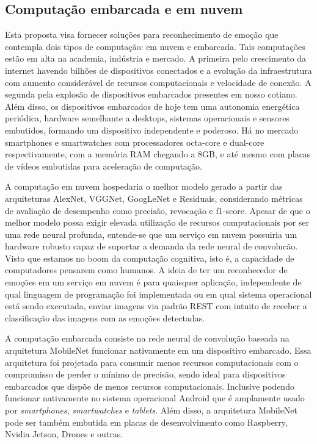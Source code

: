 \subsection{Computação embarcada e em nuvem}
Esta proposta visa fornecer soluções para reconhecimento de emoção que contempla dois tipos de computação: em nuvem e embarcada. Tais computações estão em alta na academia, indústria e mercado. A primeira pelo crescimento da internet havendo bilhões de dispositivos conectados e a evolução da infraestrutura com aumento considerável de recursos computacionais e velocidade de conexão. A segunda pela explosão de dispositivos embarcados presentes em nosso cotiano. Além disso, os dispositivos embarcados de hoje tem uma autonomia energética periódica, hardware semelhante a desktops, sistemas operacionais e sensores embutidos, formando um dispositivo independente e poderoso. Há no mercado smartphones e smartwatches com processadores octa-core e dual-core respectivamente, com a memória RAM chegando a 8GB, e até mesmo com placas de vídeos embutidas para aceleração de computação.        

A computação em nuvem hospedaria o melhor modelo gerado a partir das arquiteturas AlexNet, VGGNet, GoogLeNet e Residuais, considerando métricas de avaliação de desempenho como precisão, revocação e f1-score. Apesar de que o melhor modelo possa exigir elevada utilização de recursos computacionais por ser uma rede neural profunda, entende-se que um serviço em nuvem possuiria um hardware robusto capaz de suportar a demanda da rede neural de convolucão. Visto que estamos no boom da computação cognitiva, isto é, a capacidade de computadores pensarem como humanos. A ideia de ter um reconhecedor de emoções em um serviço em nuvem é para quaisquer aplicação, independente de qual linguagem de programação foi implementada ou em qual sistema operacional está sendo executada, enviar imagens via padrão REST com intuito de receber a classificação das imagens com as emoções detectadas.    

A computação embarcada consiste na rede neural de convolução baseada na arquitetura MobileNet funcionar nativamente em um dispositivo embarcado. Essa arquitetura foi projetada para consumir menos recursos computacionais com o compromisso de perder o mínimo de precisão, sendo ideal para dispositivos embarcados que dispõe de menos recursos computacionais. Inclusive podendo funcionar nativamente no sistema operacional Android que é amplamente usado por \textit{smartphones}, \textit{smartwatches} e \textit{tablets}. Além disso, a arquitetura MobileNet pode ser também embutida em placas de desenvolvimento como Raspberry, Nvidia Jetson, Drones e outras.  

